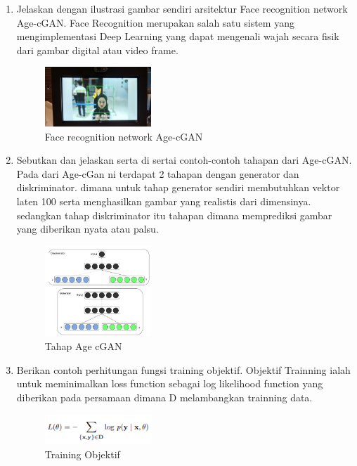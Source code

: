 \begin{enumerate}
        \item Jelaskan dengan ilustrasi gambar sendiri arsitektur Face recognition network Age-cGAN.
		Face Recognition merupakan salah satu sistem yang mengimplementasi Deep Learning yang dapat mengenali wajah secara fisik dari gambar digital atau video frame.
		\begin{figure}[H]
			\includegraphics[width=4cm]{figures/1174039/chapter9/teori7.PNG}
            	\centering
           	 \caption{Face recognition network Age-cGAN}
       	 \end{figure}

        \item Sebutkan dan jelaskan serta di sertai contoh-contoh tahapan dari Age-cGAN.
		Pada dari Age-cGan ni terdapat 2 tahapan dengan generator dan diskriminator. dimana untuk tahap generator sendiri membutuhkan vektor laten 100 serta menghasilkan gambar yang realistis dari dimensinya. sedangkan tahap diskriminator itu tahapan dimana memprediksi gambar yang diberikan nyata atau palsu.
		\begin{figure}[H]
			\includegraphics[width=4cm]{figures/1174039/chapter9/teori8.PNG}
            	\centering
           	 \caption{Tahap Age cGAN}
       	\end{figure}

        \item Berikan contoh perhitungan fungsi training objektif.
		Objektif Trainning ialah untuk meminimalkan loss function sebagai log likelihood function yang diberikan pada persamaan dimana D melambangkan trainning data.
		\begin{figure}[H]
			\includegraphics[width=4cm]{figures/1174039/chapter9/teori9.PNG}
            	\centering
           	 \caption{Training Objektif}
       	\end{figure}


\end{enumerate}
